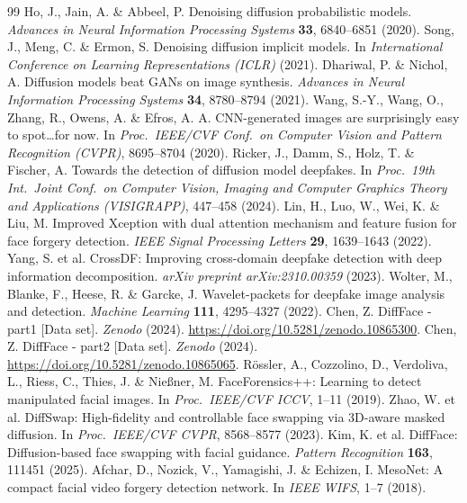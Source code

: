 \documentclass[fleqn,10pt]{wlscirep}
\begin{document}
\begin{thebibliography}{99}
 Ho, J., Jain, A. \& Abbeel, P. Denoising diffusion probabilistic models. \textit{Advances in Neural Information Processing Systems} \textbf{33}, 6840--6851 (2020).
 Song, J., Meng, C. \& Ermon, S. Denoising diffusion implicit models. In \textit{International Conference on Learning Representations (ICLR)} (2021).
 Dhariwal, P. \& Nichol, A. Diffusion models beat GANs on image synthesis. \textit{Advances in Neural Information Processing Systems} \textbf{34}, 8780--8794 (2021).
 Wang, S.-Y., Wang, O., Zhang, R., Owens, A. \& Efros, A. A. CNN-generated images are surprisingly easy to spot\dots for now. In \textit{Proc.\ IEEE/CVF Conf.\ on Computer Vision and Pattern Recognition (CVPR)}, 8695--8704 (2020).
 Ricker, J., Damm, S., Holz, T. \& Fischer, A. Towards the detection of diffusion model deepfakes. In \textit{Proc.\ 19th Int.\ Joint Conf.\ on Computer Vision, Imaging and Computer Graphics Theory and Applications (VISIGRAPP)}, 447--458 (2024).
 Lin, H., Luo, W., Wei, K. \& Liu, M. Improved Xception with dual attention mechanism and feature fusion for face forgery detection. \textit{IEEE Signal Processing Letters} \textbf{29}, 1639--1643 (2022).
 Yang, S. et al. CrossDF: Improving cross-domain deepfake detection with deep information decomposition. \textit{arXiv preprint arXiv:2310.00359} (2023).
 Wolter, M., Blanke, F., Heese, R. \& Garcke, J. Wavelet-packets for deepfake image analysis and detection. \textit{Machine Learning} \textbf{111}, 4295--4327 (2022).
 Chen, Z. DiffFace - part1 [Data set]. \textit{Zenodo} (2024). \url{https://doi.org/10.5281/zenodo.10865300}.
 Chen, Z. DiffFace - part2 [Data set]. \textit{Zenodo} (2024). \url{https://doi.org/10.5281/zenodo.10865065}.
 R\"{o}ssler, A., Cozzolino, D., Verdoliva, L., Riess, C., Thies, J. \& Nie{\ss}ner, M. FaceForensics++: Learning to detect manipulated facial images. In \textit{Proc.\ IEEE/CVF ICCV}, 1--11 (2019).
 Zhao, W. et al. DiffSwap: High-fidelity and controllable face swapping via 3D-aware masked diffusion. In \textit{Proc.\ IEEE/CVF CVPR}, 8568--8577 (2023).
 Kim, K. et al. DiffFace: Diffusion-based face swapping with facial guidance. \textit{Pattern Recognition} \textbf{163}, 111451 (2025).
 Afchar, D., Nozick, V., Yamagishi, J. \& Echizen, I. MesoNet: A compact facial video forgery detection network. In \textit{IEEE WIFS}, 1--7 (2018).

\end{thebibliography}
\end{document}
